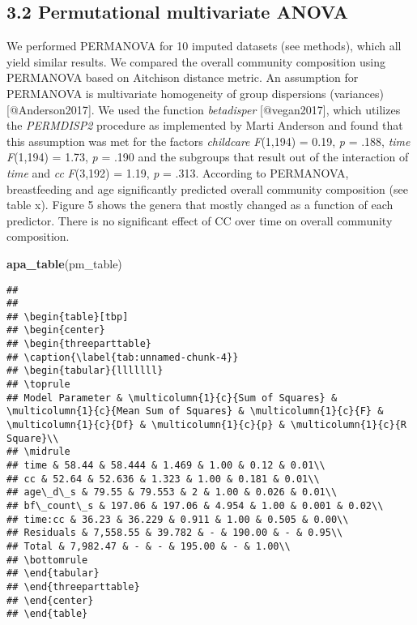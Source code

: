 \documentclass[]{article}
\newenvironment{Shaded}{\begin{snugshade}}{\end{snugshade}}
\newcommand{\KeywordTok}[1]{\textcolor[rgb]{0.13,0.29,0.53}{\textbf{#1}}}
\newcommand{\NormalTok}[1]{#1}
\begin{document}
\subsection{3.2 Permutational multivariate
ANOVA}\label{permutational-multivariate-anova}

We performed PERMANOVA for 10 imputed datasets (see methods), which all
yield similar results. We compared the overall community composition
using PERMANOVA based on Aitchison distance metric. An assumption for
PERMANOVA is multivariate homogeneity of group dispersions (variances)
{[}@Anderson2017{]}. We used the function \emph{betadisper}
{[}@vegan2017{]}, which utilizes the \emph{PERMDISP2} procedure as
implemented by Marti Anderson and found that this assumption was met for
the factors \emph{childcare} \emph{F}(1,194) = 0.19, \emph{p} = .188,
\emph{time} \emph{F}(1,194) = 1.73, \emph{p} = .190 and the subgroups
that result out of the interaction of \emph{time} and \emph{cc}
\emph{F}(3,192) = 1.19, \emph{p} = .313. According to PERMANOVA,
breastfeeding and age significantly predicted overall community
composition (see table x). Figure 5 shows the genera that mostly changed
as a function of each predictor. There is no significant effect of CC
over time on overall community composition.

\begin{Shaded}
\begin{Highlighting}[]
\KeywordTok{apa_table}\NormalTok{(pm_table)}
\end{Highlighting}
\end{Shaded}

\begin{verbatim}
## 
## 
## \begin{table}[tbp]
## \begin{center}
## \begin{threeparttable}
## \caption{\label{tab:unnamed-chunk-4}}
## \begin{tabular}{lllllll}
## \toprule
## Model Parameter & \multicolumn{1}{c}{Sum of Squares} & \multicolumn{1}{c}{Mean Sum of Squares} & \multicolumn{1}{c}{F} & \multicolumn{1}{c}{Df} & \multicolumn{1}{c}{p} & \multicolumn{1}{c}{R Square}\\
## \midrule
## time & 58.44 & 58.444 & 1.469 & 1.00 & 0.12 & 0.01\\
## cc & 52.64 & 52.636 & 1.323 & 1.00 & 0.181 & 0.01\\
## age\_d\_s & 79.55 & 79.553 & 2 & 1.00 & 0.026 & 0.01\\
## bf\_count\_s & 197.06 & 197.06 & 4.954 & 1.00 & 0.001 & 0.02\\
## time:cc & 36.23 & 36.229 & 0.911 & 1.00 & 0.505 & 0.00\\
## Residuals & 7,558.55 & 39.782 & - & 190.00 & - & 0.95\\
## Total & 7,982.47 & - & - & 195.00 & - & 1.00\\
## \bottomrule
## \end{tabular}
## \end{threeparttable}
## \end{center}
## \end{table}
\end{verbatim}
\end{document}
